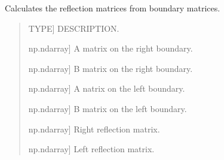 \documentclass[letterpaper,10pt,english]{sphinxmanual}
\begin{document}
\begin{fulllineitems}
\label{\detokenize{core:pywfe.core.forced_problem.generate_reflection_matrices}}
\pysigstartsignatures
{}
\pysigstopsignatures
\sphinxAtStartPar
Calculates the reflection matrices from boundary matrices.
\begin{quote}\begin{description}
\begin{description}
\sphinxlineitem{\sphinxstylestrong{eigensolution}}{[}TYPE{]}
\sphinxAtStartPar
DESCRIPTION.

\sphinxlineitem{\sphinxstylestrong{A\_right}}{[}np.ndarray{]}
\sphinxAtStartPar
A matrix on the right boundary.

\sphinxlineitem{\sphinxstylestrong{B\_right}}{[}np.ndarray{]}
\sphinxAtStartPar
B matrix on the right boundary.

\sphinxlineitem{\sphinxstylestrong{A\_left}}{[}np.ndarray{]}
\sphinxAtStartPar
A natrix on the left boundary.

\sphinxlineitem{\sphinxstylestrong{B\_left}}{[}np.ndarray{]}
\sphinxAtStartPar
B matrix on the left boundary.

\end{description}

\begin{description}
\sphinxlineitem{\sphinxstylestrong{R\_right}}{[}np.ndarray{]}
\sphinxAtStartPar
Right reflection matrix.

\sphinxlineitem{\sphinxstylestrong{R\_left}}{[}np.ndarray{]}
\sphinxAtStartPar
Left reflection matrix.

\end{description}

\end{description}\end{quote}

\end{fulllineitems}

\end{document}
